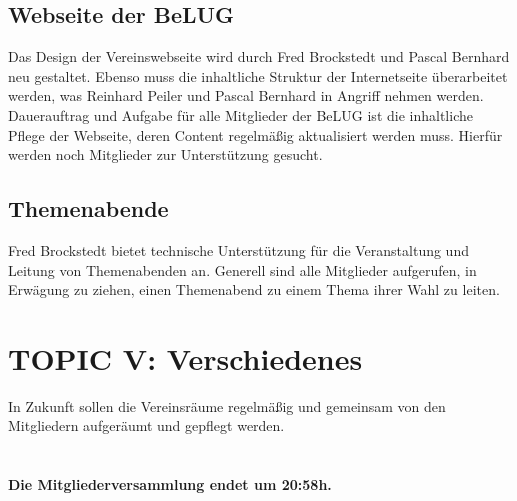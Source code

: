 \documentclass[11pt,a4paper,ngerman]{article}
\begin{document}
  
  
  \subsection{Webseite der BeLUG}
  
Das Design der Vereinswebseite wird durch Fred Brockstedt und Pascal Bernhard 
neu gestaltet. Ebenso muss die inhaltliche Struktur der Internetseite 
überarbeitet werden, was Reinhard Peiler und Pascal Bernhard in Angriff nehmen 
werden. Dauerauftrag und Aufgabe für alle Mitglieder der BeLUG ist die 
inhaltliche Pflege der Webseite, deren Content regelmäßig aktualisiert werden 
muss. Hierfür werden noch Mitglieder zur Unterstützung gesucht. 
  
  

  \subsection{Themenabende}

Fred Brockstedt bietet technische Unterstützung für die Veranstaltung und 
Leitung von Themenabenden an. Generell sind alle Mitglieder aufgerufen, in 
Erwägung zu ziehen, einen Themenabend zu einem Thema ihrer Wahl zu leiten.



\section{TOPIC V: Verschiedenes}


In Zukunft sollen die Vereinsräume regelmäßig und gemeinsam von den 
Mitgliedern aufgeräumt und gepflegt werden.\\
\\
\\
\textbf{Die Mitgliederversammlung endet um 20:58h.}
\end{document}
